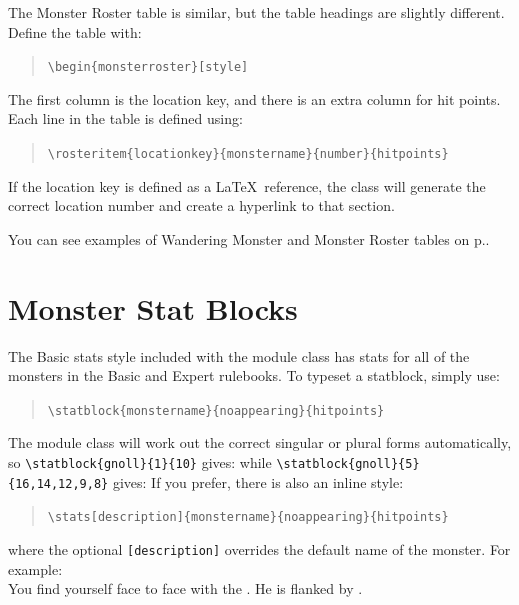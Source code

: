\documentclass[letterpaper,serif]{module}
\begin{document}
The Monster Roster table is similar, but the table headings are slightly different. Define the table with:
\begin{quote}
\verb|\begin{monsterroster}[style]|
\end{quote}
The first column is the location key, and there is an extra column for hit points. Each line in
the table is defined using:
\begin{quote}
\hspace{-2em}\verb|\rosteritem{locationkey}{monstername}{number}{hitpoints}|
\end{quote}
If the location key is defined as a \LaTeX~reference, the class will generate the correct location number and create a hyperlink to that section.

You can see examples of Wandering Monster and Monster Roster tables on p.\pageref{wanderingmonsters}.

\section{Monster Stat Blocks}
\label{stat_blocks}

The Basic stats style included with the module class has stats for all of the monsters in the Basic and Expert rulebooks.
To typeset a statblock, simply use:
\begin{quote}
\verb|\statblock{monstername}{noappearing}{hitpoints}|
\end{quote}
The module class will work out the correct singular or plural forms automatically, so
\verb|\statblock{gnoll}{1}{10}| gives:
while \verb|\statblock{gnoll}{5}{16,14,12,9,8}| gives:
If you prefer, there is also an inline style:
\begin{quote}
\hspace{-2em}\verb|\stats[description]{monstername}{noappearing}{hitpoints}|
\end{quote}
where the optional \verb|[description]| overrides the default name of the monster.
For example:\\[0.1em]

\noindent You find yourself face to face with the . He is flanked
by .\\[0.1em]
\end{document}

